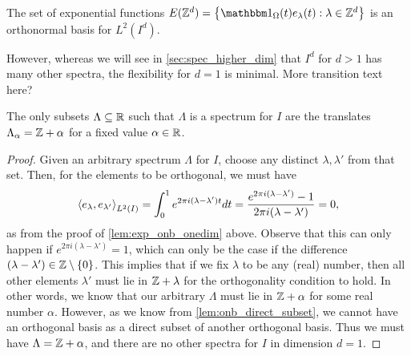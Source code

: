 \documentclass[../thesis.tex]{subfiles}
\begin{document}
\begin{theorem}\label{lem:z_d_in_higer_d}
    The set of exponential functions $E(\Z^d) = \braqMed{\indicator{\Omega}{t} e_\lambda(t) : \lambda \in \Z^d}$ is an orthonormal basis for $L^2(I^d)$.
\end{theorem}
However, whereas we will see in \cref{sec:spec_higher_dim} that $I^d$ for $d>1$ has many other spectra, the flexibility for $d=1$ is minimal. %
\colorbox{BurntOrange}{More transition text here?}
\begin{proposition}\label{prop:class_all_shift}
    The only subsets $\Lambda \subseteq \mathbb{R}$ such that $\Lambda$ is a spectrum for $I$ are the translates $\Lambda_\alpha = \mathbb{Z} + \alpha$ for a fixed value $\alpha \in \mathbb{R}$.
\end{proposition}
\begin{proof} %
    Given an arbitrary spectrum $\Lambda$ for $I$, choose any distinct $\lambda,\lambda'$ from that set. Then, for the elements to be orthogonal, we must have
    \begin{equation}\label{eq:zero_set_equation}
        \left \langle e_{\lambda},e_{\lambda'}  \right \rangle_{L^2(I)} = \int_0^1 e^{2 \pi i (\lambda-\lambda')t} dt =\frac{e^{2 \pi i (\lambda - \lambda')} -1}{2 \pi i (\lambda-\lambda')} = 0,
    \end{equation}
    as from the proof of \cref{lem:exp_onb_onedim} above. Observe that this can only happen if $e^{2\pi i (\lambda-\lambda')} = 1$, which can only be the case if the difference $(\lambda-\lambda') \in \mathbb{Z}\setminus\{0\}$. This implies that if we fix $\lambda$ to be any (real) number, then all other elements $\lambda'$ must lie in $\mathbb{Z} + \lambda$ for the orthogonality condition to hold. In other words, we know that our arbitrary $\Lambda$ must lie in $\mathbb{Z}+\alpha$ for some real number $\alpha$. However, as we know from \cref{lem:onb_direct_subset}, we cannot have an orthogonal basis as a direct subset of another orthogonal basis. Thus we must have $\Lambda = \mathbb{Z}+\alpha$, and there are no other spectra for $I$ in dimension $d=1$.
\end{proof} %
\end{document}
